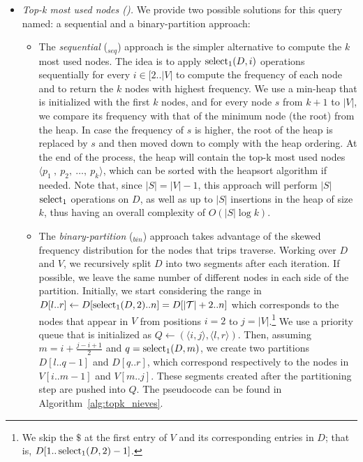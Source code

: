 \begin{itemize}
	\item {\em Top-k most used nodes (\topK).}
	We provide two possible solutions for this query named: a sequential and a binary-partition approach:

	\begin{itemize}
	\item The {\em sequential} (\topK$_{seq}$) approach is the simpler alternative to compute the $k$ most used nodes.
	The idea is	to apply  $\operatorname{select}_1(D,i)$ operations sequentially for every $i \in [2..|V|$ to compute the 
	frequency of each node and to return the $k$ nodes with highest frequency.
	We use a min-heap that is initialized with
	the first $k$ nodes, and for every node $s$ from $k+1$ to $|V|$, 
	we compare its frequency with that of the minimum node (the root) from
	the heap. In case the frequency of $s$ is higher, the root of the heap is replaced by $s$ and
	then moved down to comply with the heap ordering. At the end of the process, the heap
	will contain the top-k most used nodes $\langle p_1\:,\:p_2,\:\dots,\:p_k \rangle$, which can be 
	sorted with the heapsort algorithm if needed. 
	Note that, since $|S| = |V|-1$, this approach will perform $|S|$ $\operatorname{select}_1$ operations on $D$, as well as up to $|S|$ insertions in the heap of size $k$, thus having an overall complexity of $O(|S|\log k)$.

	\item The {\em binary-partition} (\topK$_{bin}$) approach takes advantage of the skewed 
	frequency distribution for the nodes that trips traverse.  Working over $D$ and $V$, we 
	recursively split $D$  into two segments after each iteration. 
	If possible, we leave the same number of different nodes in each side of the partition. 
	Initially, we start considering the range in $D[l..r] \leftarrow D[\operatorname{select}_1(D,2)..n]=D[|\mathcal{T}|+2..n]$ 
	which corresponds to the nodes that appear in 
	$V$ from positions $i=2$ to $j=|V|$.\footnote{We skip the $\$$ at the first entry of $V$ and its corresponding 
	entries in $D$; that is, $D[1..\operatorname{select}_1(D,2)-1]$.}
	We use a priority queue that is initialized as $Q \leftarrow (\langle i,j\rangle, \langle l,r\rangle)$.
	Then, assuming $m=i + \frac{j-i+1}{2}$ and $q=\operatorname{select}_1(D,m)$, we create two partitions 
	$D[l..q-1]$ and  $D[q..r]$, which correspond respectively to the nodes in $V[i..m-1]$ and $V[m..j]$.
	These  segments created after the partitioning step are
	pushed into  $Q$. %
	The pseudocode can be found in Algorithm~\ref{alg:topk_nieves}.


\end{itemize}
\end{itemize}
